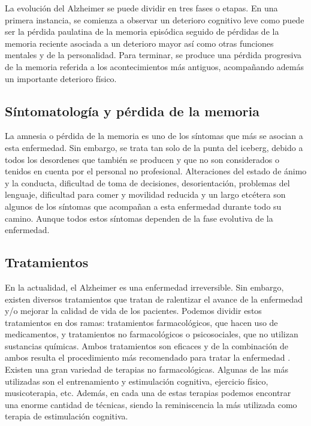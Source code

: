 La evolución del Alzheimer se puede dividir en tres fases o etapas. En una primera instancia, se comienza a observar un deterioro cognitivo leve como puede ser la pérdida paulatina de la memoria episódica seguido de pérdidas de la memoria reciente asociada a un deterioro mayor así como otras funciones mentales y de la personalidad. Para terminar, se produce una pérdida progresiva de la memoria referida a los acontecimientos más antiguos, acompañando además un importante deterioro físico.\\


\subsection{Síntomatología y pérdida de la memoria}
La amnesia o pérdida de la memoria es uno de los síntomas que más se asocian a esta enfermedad. Sin embargo, se trata tan solo de la punta del iceberg, debido a todos los desordenes que también se producen y que no son considerados o tenidos en cuenta por el personal no profesional.  Alteraciones del estado de ánimo y la conducta, dificultad de toma de decisiones, desorientación, problemas del lenguaje, dificultad para comer y movilidad reducida y un largo etcétera son algunos de los síntomas que acompañan a esta enfermedad durante todo su camino. Aunque todos estos síntomas dependen de la fase evolutiva de la enfermedad.\\


\subsection{Tratamientos}
En la actualidad, el Alzheimer es una enfermedad irreversible. Sin embargo, existen diversos tratamientos que tratan de ralentizar el avance de la enfermedad y/o mejorar la calidad de vida de los pacientes. Podemos dividir estos tratamientos en dos ramas: tratamientos farmacológicos, que hacen uso de medicamentos, y tratamientos no farmacológicos o psicosociales, que no utilizan sustancias químicas. Ambos tratamientos son eficaces y de la combinación de ambos resulta el procedimiento más recomendado para tratar la enfermedad \citep{romano2007enfermedad}.\\


Existen una gran variedad de terapias no farmacológicas. Algunas de las más utilizadas son el entrenamiento y estimulación cognitiva, ejercicio físico, musicoterapia, etc. Además, en cada una de estas terapias podemos encontrar una enorme cantidad de técnicas, siendo la reminiscencia la más utilizada como terapia de estimulación cognitiva.\\


